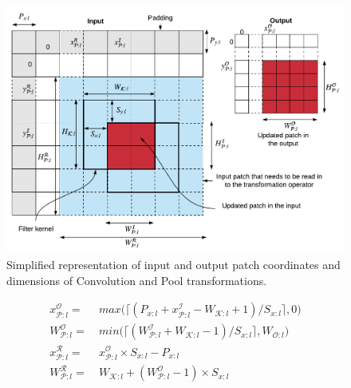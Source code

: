 \begin{figure}[t]
\includegraphics[width=\columnwidth]{images/dimensions}
\caption{Simplified representation of input and output patch coordinates and dimensions of Convolution and Pool transformations.}
\label{fig:dimensions}
\end{figure}

\begin{align}
\label{eqn:xcoordinate}
x^\mathcal{O}_{\mathcal{P}:l} =&~ max\big(\lceil (P_{x:l} + x^\mathcal{I}_{\mathcal{P}:l} - W_{\mathcal{K}:l} + 1)/S_{x:l} \rceil, 0\big)\\
\label{eqn:patchwidth}
W^\mathcal{O}_{\mathcal{P}:l} =&~ min\big(\lceil (W^\mathcal{I}_{\mathcal{P}:l} + W_{\mathcal{K}:l} - 1)/ S_{x:l} \rceil, W_{\mathcal{O}:l}\big)\\
\label{eqn:xreadcoordinate}
x^\mathcal{R}_{\mathcal{P}:l} =&~ x^\mathcal{O}_{\mathcal{P}:l} \times S_{x:l} - P_{x:l}\\
\label{eqn:readpatchwidth}
W^\mathcal{R}_{\mathcal{P}:l} =&~ W_{\mathcal{K}:l} + (W^\mathcal{O}_{\mathcal{P}:l}-1) \times S_{x:l}
\end{align}



